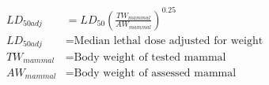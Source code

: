 \documentclass[fleqn, oneside, 11pt]{article}%
\begin{document}
\begin{preview}
\begin{align*}%
LD_{50adj} & = LD_{50}\left(\frac{TW_{mammal}}{AW_{mammal}}\right)^{0.25}\nonumber \\
LD_{50adj} & =  \text{Median lethal dose adjusted for weight} \nonumber \\
TW_{mammal} & =  \text{Body weight of tested mammal} \nonumber \\
AW_{mammal} & =  \text{Body weight of assessed mammal} \nonumber \\
\end{align*} 
\end{preview}
\end{document}
